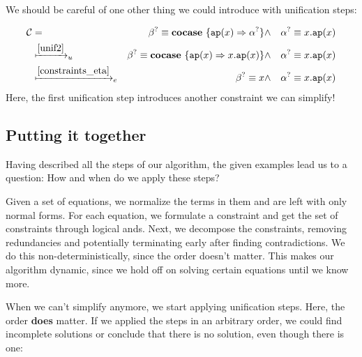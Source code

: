 \documentclass[twoside,12pt,a4paper]{article}
\begin{document}
We should be careful of one other thing we could introduce with unification steps:
\begin{example}
    \begin{align*}
        \mathcal{C} &=& \beta^? \equiv \textbf{cocase}\ \{\texttt{ap}(x)\Rightarrow\alpha^?\}
        &\wedge& \alpha^? \equiv x.\texttt{ap}(x)\\
        &\xmapsto{\ref{unif2}}_u& \beta^?\equiv \textbf{cocase}\ \{\texttt{ap}(x)\Rightarrow x.\texttt{ap}(x)\}
        &\wedge& \alpha^? \equiv x.\texttt{ap}(x)\\
        &\xmapsto{\ref{constraints_eta}}_e& \beta^?\equiv x 
        &\wedge& \alpha^? \equiv x.\texttt{ap}(x)
    \end{align*}
    Here, the first unification step introduces another constraint we can simplify! 
\end{example}

\subsection{Putting it together}\label{sec:Putting it together}
Having described all the steps of our algorithm, the given examples lead us to a question:
How and when do we apply these steps?

Given a set of equations, we normalize the terms in them and are left with only normal forms. 
For each equation, we formulate a constraint and get the set of constraints through logical ands.
Next, we decompose the constraints, removing redundancies and potentially terminating early after finding contradictions.
We do this non-deterministically, since the order doesn't matter.
This makes our algorithm dynamic, since we hold off on solving certain equations until we know more.

When we can't simplify anymore, we start applying  unification steps.
Here, the order \textbf{does} matter. If we applied the steps in an arbitrary order, 
we could find incomplete solutions or conclude that there is no solution, even though there is one:
\end{document}
